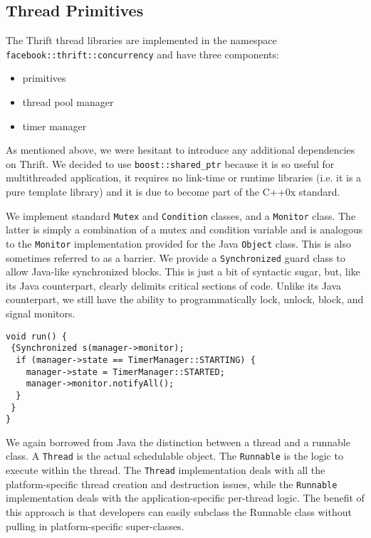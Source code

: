 \documentclass[nocopyrightspace,blockstyle]{sigplanconf}
\begin{document}
\subsection{Thread Primitives}

The Thrift thread libraries are implemented in the namespace\\
\texttt{facebook::thrift::concurrency} and have three components:
\begin{itemize}
\item primitives
\item thread pool manager
\item timer manager
\end{itemize}

As mentioned above, we were hesitant to introduce any additional dependencies
on Thrift. We decided to use \texttt{boost::shared\_ptr} because it is so 
useful for multithreaded application, it requires no link-time or
runtime libraries (i.e. it is a pure template library) and it is due
to become part of the C++0x standard.

We implement standard \texttt{Mutex} and \texttt{Condition} classes, and a
 \texttt{Monitor} class. The latter is simply a combination of a mutex and 
condition variable and is analogous to the \texttt{Monitor} implementation provided for
the Java \texttt{Object} class. This is also sometimes referred to as a barrier. We 
provide a \texttt{Synchronized} guard class to allow Java-like synchronized blocks.
This is just a bit of syntactic sugar, but, like its Java counterpart, clearly 
delimits critical sections of code. Unlike its Java counterpart, we still
have the ability to programmatically lock, unlock, block, and signal monitors.

\begin{verbatim}
void run() {
 {Synchronized s(manager->monitor);
  if (manager->state == TimerManager::STARTING) {
    manager->state = TimerManager::STARTED;
    manager->monitor.notifyAll();
  }
 }
}
\end{verbatim}

We again borrowed from Java the distinction between a thread and a runnable
class. A \texttt{Thread} is the actual schedulable object. The
\texttt{Runnable} is the logic to execute within the thread. 
The \texttt{Thread} implementation deals with all the platform-specific thread 
creation and destruction issues, while the \texttt{Runnable} implementation deals
with the application-specific per-thread logic. The benefit of this approach
is that developers can easily subclass the Runnable class without pulling in 
platform-specific super-classes.
\end{document}

